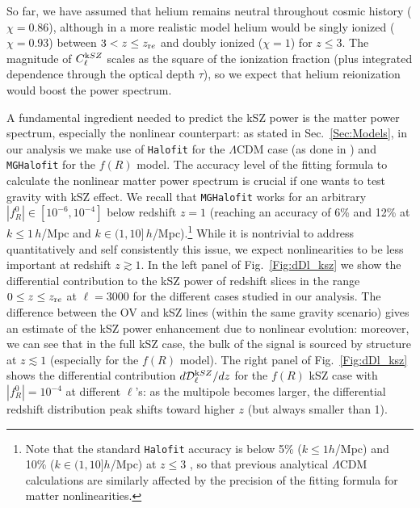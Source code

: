 So far, we have assumed that helium remains neutral throughout cosmic history ($\chi = 0.86$), although in a more realistic model helium would be singly ionized ($\chi = 0.93$) between $3 < z \le z_{\rm re}$ and doubly ionized ($\chi=1$) for $z \le 3$. The magnitude of $C^{\rm kSZ}_{\ell}$ scales as the square of the ionization fraction (plus integrated dependence through the optical depth $\tau$), so we expect that helium reionization would boost the power spectrum.

A fundamental ingredient needed to predict the kSZ power is the matter power spectrum, especially the nonlinear counterpart: as stated in Sec.~\eqref{Sec:Models}, in our analysis we make use of \texttt{Halofit} for the $\Lambda$CDM case (as done in \cite{Shaw2012,Ma2014a}) and \texttt{MGHalofit} for the $f(R)$ model. The accuracy level of the fitting formula to calculate the nonlinear matter power spectrum is crucial if one wants to test gravity with kSZ effect. We recall that \texttt{MGHalofit} works for an arbitrary $|f^0_R| \in [10^{-6},10^{-4}]$ below redshift $z = 1$ (reaching an accuracy of 6\% and 12\% at $k \le 1 \,h$/Mpc and $k \in (1, 10]\, h$/Mpc).\footnote{Note that the standard \texttt{Halofit} accuracy is below 5\% ($k \le 1 h$/Mpc) and 10\% ($k \in (1, 10] h$/Mpc) at $z \le 3$ \citep{Takahashi2012}, so that previous analytical $\Lambda$CDM calculations are similarly affected by the precision of the fitting formula for matter nonlinearities.} While it is nontrivial to address quantitatively and self consistently this issue, we expect nonlinearities to be less important at redshift $z\gtrsim1$. In the left panel of Fig.~\eqref{Fig:dDl_ksz} we show the differential contribution to the kSZ power of redshift slices in the range $0 \le z \le z_{\rm re}$ at $\ell = 3000$ for the different cases studied in our analysis. The difference between the OV and kSZ lines (within the same gravity scenario) gives an estimate of the kSZ power enhancement due to nonlinear evolution: moreover, we can see that in the full kSZ case, the bulk of the signal is sourced by structure at $z \lesssim 1$ (especially for the $f(R)$ model). The right panel of Fig.~\eqref{Fig:dDl_ksz} shows the differential contribution $d\mathcal{D}^{\rm kSZ}_{\ell}/dz$ for the $f(R)$ kSZ case with $|f^0_R|=10^{-4}$ at different $\ell$'s: as the multipole becomes larger, the differential redshift distribution peak shifts toward higher $z$ (but always smaller than 1).

